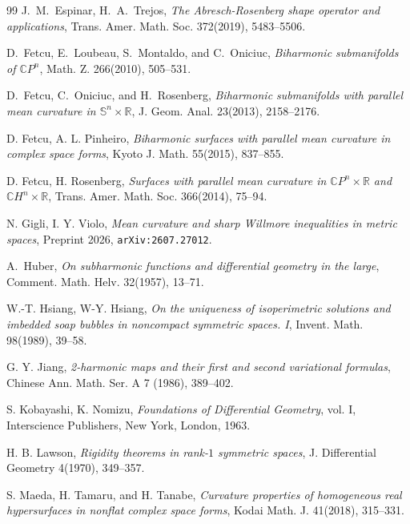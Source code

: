 \documentclass[11pt]{amsart}
\theoremstyle{plain}
\theoremstyle{definition}
\numberwithin{equation}{section}
\begin{document}
\begin{thebibliography}{99}
 J.~M.~Espinar, H.~A.~Trejos, \textit{The Abresch-Rosenberg shape operator and applications}, Trans. Amer. Math. Soc. 372(2019), 5483--5506.



 D.~Fetcu, E.~Loubeau, S.~Montaldo, and C.~Oniciuc, \textit{Biharmonic submanifolds of $\mathbb{C}P^n$}, Math. Z. 266(2010), 505--531.

 D.~Fetcu, C.~Oniciuc, and H.~Rosenberg, {\it Biharmonic submanifolds with parallel mean curvature in $\mathbb{S}^n\times\mathbb{R}$}, J. Geom. Anal. 23(2013), 2158--2176.

 D. Fetcu, A. L. Pinheiro, \textit{Biharmonic surfaces with parallel mean curvature in complex space forms}, Kyoto J. Math. 55(2015), 837--855. 

 D. Fetcu, H. Rosenberg, \textit{Surfaces with parallel mean curvature in $\mathbb{C}P^n\times\mathbb{R}$ and $\mathbb{C}H^n\times\mathbb{R}$}, Trans. Amer. Math. Soc. 366(2014), 75--94.

 N. Gigli, I. Y. Violo, {\it Mean curvature and sharp Willmore inequalities in metric spaces}, Preprint 2026, \texttt{arXiv:2607.27012}. 


 A.~Huber, \textit{On subharmonic functions and differential geometry in the
large}, Comment. Math. Helv. 32(1957), 13--71.

 W.-T. Hsiang, W-Y. Hsiang, {\it On the uniqueness of isoperimetric solutions and imbedded soap bubbles in noncompact symmetric spaces. I}, Invent. Math. 98(1989), 39--58. 

 G. Y. Jiang, {\it 2-harmonic maps and their first and second variational formulas}, Chinese Ann. Math. Ser. A 7 (1986), 389--402.

 S. Kobayashi, K. Nomizu, {\it Foundations of Differential Geometry}, vol. I, Interscience Publishers, New York, London, 1963.

 H. B. Lawson, {\it Rigidity theorems in rank-$1$ symmetric spaces}, J. Differential Geometry 4(1970), 349--357.


 S. Maeda, H. Tamaru, and H. Tanabe, {\it Curvature properties of homogeneous real hypersurfaces in nonflat complex space forms}, Kodai Math. J. 41(2018), 315--331.


\end{thebibliography}
\end{document}
